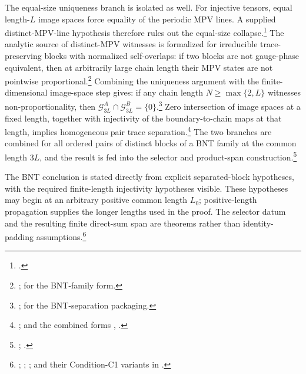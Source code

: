 \documentclass{article}
\begin{document}
The equal-size uniqueness branch is isolated as well. For injective tensors,
equal length-$L$ image spaces force equality of the periodic MPV lines. A
supplied distinct-MPV-line hypothesis therefore rules out the equal-size
collapse.\footnote{.}
The analytic source of distinct-MPV witnesses is formalized for irreducible
trace-preserving blocks with normalized self-overlaps: if two blocks are not
gauge-phase equivalent, then at arbitrarily large chain length their MPV states
are not pointwise proportional.\footnote{%
;
for the BNT-family form.}
Combining the uniqueness argument with the finite-dimensional image-space step
gives: if any chain length $N\ge\max\{2,L\}$ witnesses non-proportionality,
then $\mathcal G_{3L}^A\cap\mathcal G_{3L}^B=\{0\}$.\footnote{%
;
for the BNT-separation packaging.}
Zero intersection of image spaces at a fixed length, together with injectivity
of the boundary-to-chain maps at that length, implies homogeneous pair trace
separation.\footnote{;
and the combined forms
,
.}
The two branches are combined for all ordered pairs of distinct blocks of a
BNT family at the common length $3L$, and the result is fed into the
selector and product-span construction.\footnote{%
;
.}

The BNT conclusion is stated directly from explicit separated-block
hypotheses, with the required finite-length injectivity hypotheses visible.
These hypotheses may begin at an arbitrary positive common length $L_0$;
positive-length propagation supplies the longer lengths used in the proof.
The selector datum and the resulting finite direct-sum span are theorems rather
than identity-padding assumptions.\footnote{%
;
;
;
and their Condition-C1 variants in
.}
\end{document}
